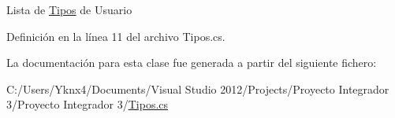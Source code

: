 Lista de \hyperlink{class_proyecto___integrador__3_1_1_tipos}{Tipos} de Usuario 



Definición en la línea 11 del archivo Tipos.\-cs.



La documentación para esta clase fue generada a partir del siguiente fichero\-:\begin{DoxyCompactItemize}
\item 
C\-:/\-Users/\-Yknx4/\-Documents/\-Visual Studio 2012/\-Projects/\-Proyecto Integrador 3/\-Proyecto Integrador 3/\hyperlink{_tipos_8cs}{Tipos.\-cs}\end{DoxyCompactItemize}
